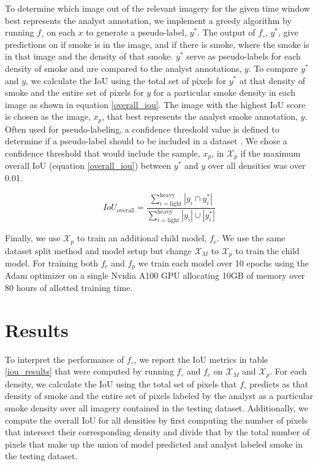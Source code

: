 \documentclass{article}
\begin{document}
To determine which image out of the relevant imagery for the given time window best represents the analyst annotation, we implement a greedy algorithm by running \(f_{\circ}\) on each \(x\) to generate a pseudo-label, \(y^*\). The output of \(f_{\circ}\), \(y^*\), give predictions on if smoke is in the image, and if there is smoke, where the smoke is in that image and the density of that smoke. \(y^*\) serve as pseudo-labels for each density of smoke and are compared to the analyst annotations, \(y\). To compare \(y^*\) and \(y\), we calculate the IoU using the total set of pixels for \(y^*\) at that density of smoke and the entire set of pixels for \(y\) for a particular smoke density in each image as shown in equation \ref{overall_iou}. The image with the highest IoU score is chosen as the image, \(x_p\), that best represents the analyst smoke annotation, \(y\). Often used for pseudo-labeling, a confidence threshold value is defined to determine if a pseudo-label should to be included in a dataset \cite{conf_thresh}. We chose a confidence threshold that would include the sample, \(x_p\), in \(\mathcal{X}_{p}\) if the maximum overall IoU (equation \ref{overall_iou}) between \(y^*\) and \(y\) over all densities was over 0.01. 

\begin{equation} \label{overall_iou}
    IoU_{\text{overall}} = \frac{\sum\limits_{i=\text{light}}^{\text{heavy}}|y_{i}\cap y^*_{i}|}{\sum\limits_{i=\text{light}}^{\text{heavy}}|y_{i}|\cup|y^*_{i}|}
\end{equation}

Finally, we use \(\mathcal{X}_{p}\) to train an additional child model, \(f_c\). We use the same dataset split method and model setup but change \(\mathcal{X}_M\) to \(\mathcal{X}_{p}\) to train the child model. For training both \(f_c\) and \(f_p\) we train each model over 10 epochs using the Adam optimizer on a single Nvidia A100 GPU allocating 10GB of memory over 80 hours of allotted training time.

\section*{Results}

To interpret the performance of \(f_{\circ}\), we report the IoU metrics in table \ref{iou_results} that were computed by running \(f_{\circ}\) and \(f_c\) on \(\mathcal{X}_M\) and \(\mathcal{X}_{p}\). For each density, we calculate the IoU using the total set of pixels that \(f_{\circ}\) predicts as that density of smoke and the entire set of pixels labeled by the analyst as a particular smoke density over all imagery contained in the testing dataset. Additionally, we compute the overall IoU for all densities by first computing the number of pixels that intersect their corresponding density and divide that by the total number of pixels that make up the union of model predicted and analyst labeled smoke in the testing dataset.
\end{document}
